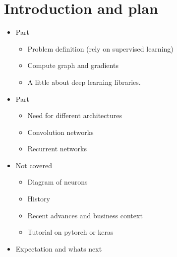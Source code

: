 \section{Introduction and plan}
\begin{frame}{}
	\begin{itemize}
		\item Part 	
			\begin{itemize}
				\item Problem definition (rely on supervised learning)
				\item Compute graph and gradients 
				\item A little about deep learning libraries. 
			\end{itemize}
		\item Part 
			\begin{itemize}
				\item Need for different architectures
				\item Convolution networks 
				\item Recurrent networks  
			\end{itemize}
		\item Not covered 
			\begin{itemize}
				\item Diagram of neurons 
				\item History  
				\item Recent advances and business context
				\item Tutorial on pytorch or keras 
			\end{itemize}
		\item Expectation and whats next
	\end{itemize}
\end{frame}
